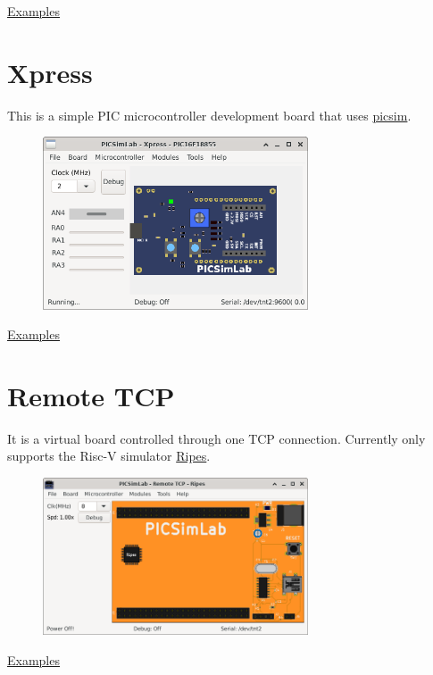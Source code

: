 \href{https://lcgamboa.github.io/picsimlab_examples/board_Curiosity_HPC.html}{Examples}

\section{Xpress}

This is a simple PIC microcontroller development board that uses \href{https://github.com/lcgamboa/picsim}{picsim}.

\begin{figure}[H]
\center
\includegraphics[width=0.7\textwidth]{img/Xpress.png} 
\end{figure} 

\href{https://lcgamboa.github.io/picsimlab_examples/board_Xpress.html}{Examples}

\section{Remote TCP}

It is a virtual board controlled through one TCP connection. 
Currently only supports the Risc-V simulator \href{https://github.com/mortbopet/Ripes}{Ripes}.

\begin{figure}[H]
\center
\includegraphics[width=0.7\textwidth]{img/RemoteTCP.png} 
\end{figure} 

\href{https://lcgamboa.github.io/picsimlab_examples/board_Remote_TCP.html}{Examples}



